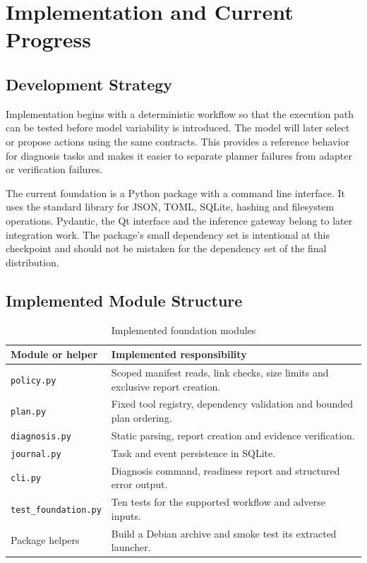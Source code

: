 \chapter{Implementation and Current Progress}
\section{Development Strategy}
Implementation begins with a deterministic workflow so that the execution path can be tested before model variability is introduced. The model will later select or propose actions using the same contracts. This provides a reference behavior for diagnosis tasks and makes it easier to separate planner failures from adapter or verification failures.

The current foundation is a Python package with a command line interface. It uses the standard library for JSON, TOML, SQLite, hashing and filesystem operations. Pydantic, the Qt interface and the inference gateway belong to later integration work. The package's small dependency set is intentional at this checkpoint and should not be mistaken for the dependency set of the final distribution.

\section{Implemented Module Structure}
\begin{table}[htbp]\centering\small
\caption{Implemented foundation modules}
\begin{tabularx}{\textwidth}{P{36mm}Y}
\toprule\textbf{Module or helper} & \textbf{Implemented responsibility}\\\midrule
\texttt{policy.py} & Scoped manifest reads, link checks, size limits and exclusive report creation.\\
\texttt{plan.py} & Fixed tool registry, dependency validation and bounded plan ordering.\\
\texttt{diagnosis.py} & Static parsing, report creation and evidence verification.\\
\texttt{journal.py} & Task and event persistence in SQLite.\\
\texttt{cli.py} & Diagnosis command, readiness report and structured error output.\\
\texttt{test\_foundation.py} & Ten tests for the supported workflow and adverse inputs.\\
Package helpers & Build a Debian archive and smoke test its extracted launcher.\\\bottomrule
\end{tabularx}\end{table}


